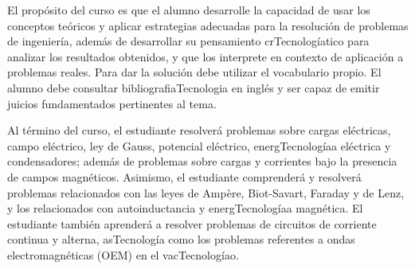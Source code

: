 \begin{syllabus}


\begin{justification}
El propósito del curso es que el alumno desarrolle la capacidad de usar los conceptos teóricos y aplicar estrategias adecuadas para la resolución de problemas de ingeniería, además de desarrollar su pensamiento crTecnologíatico para analizar los resultados obtenidos, y que los interprete en contexto de aplicación a problemas reales. Para dar la solución debe utilizar el vocabulario propio. El alumno debe consultar bibliografiaTecnologia en inglés y ser capaz de emitir juicios fundamentados pertinentes al tema. 
\end{justification}

\begin{goals}
\item Al término del curso, el estudiante resolverá problemas sobre cargas eléctricas, campo eléctrico, ley de Gauss, potencial eléctrico, energTecnologíaa eléctrica y condensadores; además de problemas sobre cargas y corrientes bajo la presencia de campos magnéticos. Asimismo, el estudiante comprenderá y resolverá problemas relacionados con las leyes de Ampère, Biot-Savart, Faraday y de Lenz, y los relacionados con autoinductancia y energTecnologíaa magnética. El estudiante también aprenderá a resolver problemas de circuitos de corriente continua y alterna, asTecnología como los problemas referentes a ondas electromagnéticas (OEM) en el vacTecnologíao.
\end{goals}

\begin{outcomes}
\item {}
\item {}
\end{outcomes}

\begin{competences}
    \item {}
\end{competences}


\end{syllabus}
